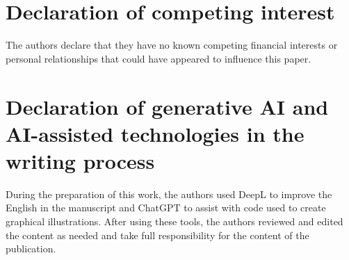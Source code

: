 \documentclass[final,3p,times,twocolumn,authoryear]{elsarticle}
\begin{document}
\section*{Declaration of competing interest}
The authors declare that they have no known competing financial interests or personal relationships that could have appeared to influence this paper.

\section*{Declaration of generative AI and AI-assisted technologies in the writing process}
During the preparation of this work, the authors used DeepL to improve the English in the manuscript and ChatGPT to assist with code used to create graphical illustrations. After using these tools, the authors reviewed and edited the content as needed and take full responsibility for the content of the publication.




\end{document}
